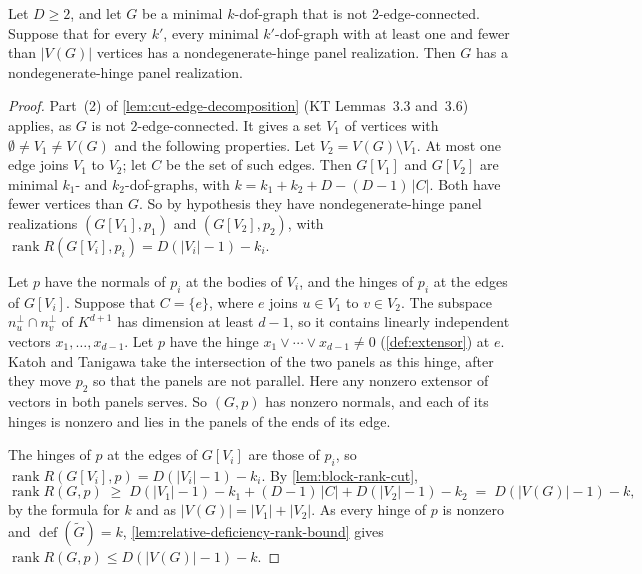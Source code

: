 \begin{lemma}
  \label{lem:case-cut-edge-realization}
  \leanok
  Let $D \ge 2$, and let $G$ be a minimal $k$-dof-graph that is not
  $2$-edge-connected. Suppose that for every $k'$, every minimal
  $k'$-dof-graph with at least one and fewer than $|V(G)|$ vertices has a
  nondegenerate-hinge panel realization. Then $G$ has a
  nondegenerate-hinge panel realization.
\end{lemma}
\begin{proof}
  \leanok
  Part~(2) of \cref{lem:cut-edge-decomposition} (KT Lemmas~3.3
  and~3.6) applies, as $G$ is not $2$-edge-connected. It gives a set
  $V_1$ of vertices with $\emptyset \neq V_1 \neq V(G)$ and the
  following properties. Let $V_2 = V(G) \setminus V_1$. At most one edge
  joins $V_1$ to $V_2$; let $C$ be the set of such edges. Then $G[V_1]$
  and $G[V_2]$ are minimal $k_1$- and $k_2$-dof-graphs, with
  $k = k_1 + k_2 + D - (D-1)\,|C|$. Both have fewer vertices than $G$.
  So by hypothesis they have nondegenerate-hinge panel realizations
  $(G[V_1], p_1)$ and $(G[V_2], p_2)$, with
  $\operatorname{rank} R(G[V_i], p_i) = D(|V_i| - 1) - k_i$.

  Let $p$ have the normals of $p_i$ at the bodies of $V_i$, and the
  hinges of $p_i$ at the edges of $G[V_i]$. Suppose that $C = \{e\}$,
  where $e$ joins $u \in V_1$ to $v \in V_2$. The subspace
  $n_u^\perp \cap n_v^\perp$ of $K^{d+1}$ has dimension at least
  $d - 1$, so it contains linearly independent vectors
  $x_1, \dots, x_{d-1}$. Let $p$ have the hinge
  $x_1 \vee \cdots \vee x_{d-1} \neq 0$ (\cref{def:extensor}) at $e$.
  Katoh and Tanigawa take the intersection of the two panels as this
  hinge, after they move $p_2$ so that the panels are not parallel. Here
  any nonzero extensor of vectors in both panels serves. So $(G,p)$ has
  nonzero normals, and each of its hinges is nonzero and lies in the
  panels of the ends of its edge.

  The hinges of $p$ at the edges of $G[V_i]$ are those of $p_i$, so
  $\operatorname{rank} R(G[V_i], p) = D(|V_i| - 1) - k_i$. By
  \cref{lem:block-rank-cut},
  \[
    \operatorname{rank} R(G,p) \;\ge\;
    D(|V_1| - 1) - k_1 + (D-1)\,|C| + D(|V_2| - 1) - k_2
    \;=\; D(|V(G)| - 1) - k,
  \]
  by the formula for $k$ and as $|V(G)| = |V_1| + |V_2|$. As every hinge
  of $p$ is nonzero and $\operatorname{def}(\tilde G) = k$,
  \cref{lem:relative-deficiency-rank-bound} gives
  $\operatorname{rank} R(G,p) \le D(|V(G)| - 1) - k$.
\end{proof}

